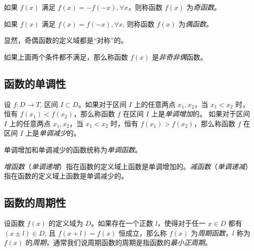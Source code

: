 \documentclass[lang=cn,10pt]{elegantbook}
\begin{document}
如果 $f(x)$ 满足 $f(x) = -f(-x), \forall x$，则称函数 $f(x)$ 为\emph{奇函数}。

如果 $f(x)$ 满足 $f(x) = f(-x), \forall x$, 则称函数 $f(x)$ 为\emph{偶函数}。

显然，奇偶函数的定义域都是“对称”的。

如果上面两个条件都不满足，那么称函数 $f(x)$ 是\emph{非奇非偶}函数。

\subsection{函数的单调性}

设 $f: D \rightarrow T$, 区间 $I \subset D$。如果对于区间 $I$ 上的任意两点 $x_1, x_2$，当 $x_1 < x_2$ 时，恒有 $f(x_1) < f(x_2)$，那么称函数 $f$ 在区间 $I$ 上是\emph{单调增加}的。
如果对于区间 $I$ 上的任意两点 $x_1, x_2$，当 $x_1 < x_2$ 时，恒有 $f(x_1) > f(x_2)$，那么称函数 $f$ 在区间 $I$ 上是\emph{单调减少}的。

单调增加和单调减少的函数统称为\emph{单调函数}。

\emph{增函数}（\emph{单调递增}）指在函数的定义域上函数是单调增加的。\emph{减函数}（\emph{单调递减}）指在函数的定义域上函数是单调减少的。

\subsection{函数的周期性}

设函数 $f(x)$ 的定义域为 $D$。如果存在一个正数 $l$，使得对于任一 $x \in D$ 都有 $(x \pm l) \in D$, 且 $f(x+l)=f(x)$ 恒成立，那么称 $f(x)$ 为\emph{周期函数}，$l$ 称为 $f(x)$ 的\emph{周期}，通常我们说周期函数的周期是指函数的\emph{最小正周期}。

\newpage
\end{document}
